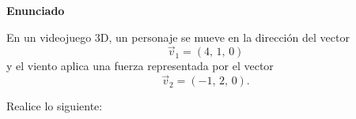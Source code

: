 
\begin{center}
\colorbox{gray!10}{\parbox{0.95\textwidth}{
\vspace{0.3cm}
\centering
\textbf{\large Enunciado}
\vspace{0.2cm}

\begin{minipage}{0.9\textwidth}
En un videojuego 3D, un personaje se mueve en la dirección del vector
\[ \vec v_1 = (4,\,1,\,0) \]
y el viento aplica una fuerza representada por el vector
\[ \vec v_2 = (-1,\,2,\,0). \]
\end{minipage}
\vspace{0.3cm}
}}
\end{center}

\vspace{0.5em}
\noindent Realice lo siguiente:

